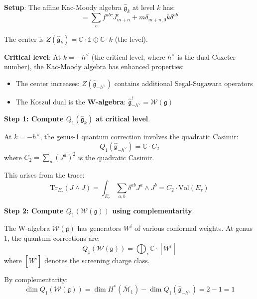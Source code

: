 \begin{example}
\label{ex:kac-moody-complementarity-explicit}

\textbf{Setup}: The affine Kac-Moody algebra $\widehat{\mathfrak{g}}_k$ at level $k$ 
has:
\begin{equation}
[J^a_m, J^b_n] = \sum_c f^{abc} J^c_{m+n} + m\delta_{m+n,0} k \delta^{ab}
\end{equation}

The center is $Z(\widehat{\mathfrak{g}}_k) = \mathbb{C} \cdot \mathbb{1} \oplus 
\mathbb{C} \cdot k$ (the level).

\textbf{Critical level}: At $k = -h^\vee$ (the critical level, where $h^\vee$ is the 
dual Coxeter number), the Kac-Moody algebra has enhanced properties:
\begin{itemize}
\item The center increases: $Z(\widehat{\mathfrak{g}}_{-h^\vee})$ contains additional 
Segal-Sugawara operators
\item The Koszul dual is the \textbf{W-algebra}: $\widehat{\mathfrak{g}}_{-h^\vee}^! 
= \mathcal{W}(\mathfrak{g})$
\end{itemize}

\textbf{Step 1: Compute $Q_1(\widehat{\mathfrak{g}}_k)$ at critical level}.

At $k = -h^\vee$, the genus-1 quantum correction involves the quadratic Casimir:
\begin{equation}
Q_1(\widehat{\mathfrak{g}}_{-h^\vee}) = \mathbb{C} \cdot C_2
\end{equation}
where $C_2 = \sum_a (J^a)^2$ is the quadratic Casimir.

This arises from the trace:
\begin{equation}
\text{Tr}_{E_\tau}(J \wedge J) = \int_{E_\tau} \sum_{a,b} \delta^{ab} J^a \wedge J^b 
= C_2 \cdot \text{Vol}(E_\tau)
\end{equation}

\textbf{Step 2: Compute $Q_1(\mathcal{W}(\mathfrak{g}))$ using complementarity}.

The W-algebra $\mathcal{W}(\mathfrak{g})$ has generators $W^i$ of various conformal 
weights. At genus 1, the quantum corrections are:
\begin{equation}
Q_1(\mathcal{W}(\mathfrak{g})) = \bigoplus_{i} \mathbb{C} \cdot [W^i]
\end{equation}
where $[W^i]$ denotes the screening charge class.

By complementarity:
\begin{equation}
\dim Q_1(\mathcal{W}(\mathfrak{g})) = \dim H^*(\overline{\mathcal{M}}_1) - \dim Q_1(
\widehat{\mathfrak{g}}_{-h^\vee}) = 2 - 1 = 1
\end{equation}


\end{example}
